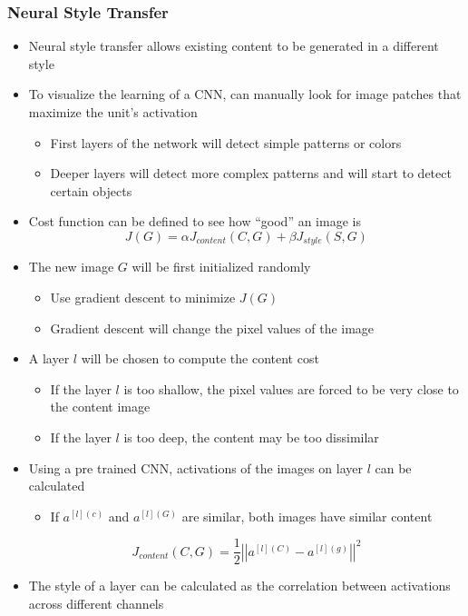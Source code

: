 \documentclass[12pt, letterpaper]{article}
\begin{document}
    \subsubsection{Neural Style Transfer}
    \begin{itemize}
        \item Neural style transfer allows existing content to be generated in a different style
        \item To visualize the learning of a CNN, can manually look for image patches that maximize the unit's activation
        \begin{itemize}
            \item First layers of the network will detect simple patterns or colors
            \item Deeper layers will detect more complex patterns and will start to detect certain objects
        \end{itemize}
        \item Cost function can be defined to see how ``good'' an image is
        $$J(G)=\alpha J_{content}(C,G)+\beta J_{style}(S,G)$$
        \item The new image $G$ will be first initialized randomly
        \begin{itemize}
            \item Use gradient descent to minimize $J(G)$
            \item Gradient descent will change the pixel values of the image
        \end{itemize}
        \item A layer $l$ will be chosen to compute the content cost
        \begin{itemize}
            \item If the layer $l$ is too shallow, the pixel values are forced to be very close to the content image
            \item If the layer $l$ is too deep, the content may be too dissimilar
        \end{itemize}
        \item Using a pre trained CNN, activations of the images on layer $l$ can be calculated
        \begin{itemize}
            \item If $a^{[l](c)}$ and $a^{[l](G)}$ are similar, both images have similar content
        \end{itemize}
        $$J_{content}(C,G)=\frac{1}{2}\left|\left|a^{[l](C)}-a^{[l](g)}\right|\right|^2$$
        \item The style of a layer can be calculated as the correlation between activations across different channels

\end{itemize}
\end{document}
